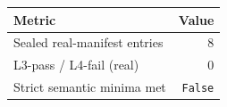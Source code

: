 \begin{tabular}{lr}
\hline
Metric & Value \\
\hline
Sealed real-manifest entries & 8 \\
L3-pass / L4-fail (real) & 0 \\
Strict semantic minima met & \texttt{False} \\
\hline
\end{tabular}
